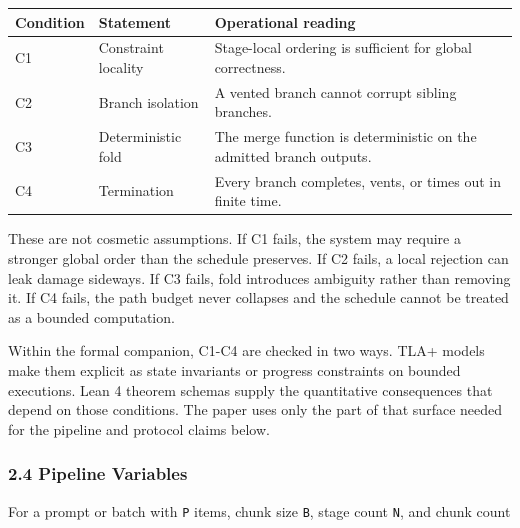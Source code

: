 \documentclass[
  11pt,
]{article}
\newcounter{none} %
\begin{document}
{\def\LTcaptype{none} %
\begin{longtable}[]{@{}
  >{\raggedright\arraybackslash}p{}
  >{\raggedright\arraybackslash}p{}
  >{\raggedright\arraybackslash}p{}@{}}
\toprule\noalign{}
\begin{minipage}[b]{\linewidth}\raggedright
Condition
\end{minipage} & \begin{minipage}[b]{\linewidth}\raggedright
Statement
\end{minipage} & \begin{minipage}[b]{\linewidth}\raggedright
Operational reading
\end{minipage} \\
\midrule\noalign{}
\endhead
\bottomrule\noalign{}
\endlastfoot
C1 & Constraint locality & Stage-local ordering is sufficient for global
correctness. \\
C2 & Branch isolation & A vented branch cannot corrupt sibling
branches. \\
C3 & Deterministic fold & The merge function is deterministic on the
admitted branch outputs. \\
C4 & Termination & Every branch completes, vents, or times out in finite
time. \\
\end{longtable}
}

These are not cosmetic assumptions. If C1 fails, the system may require
a stronger global order than the schedule preserves. If C2 fails, a
local rejection can leak damage sideways. If C3 fails, fold introduces
ambiguity rather than removing it. If C4 fails, the path budget never
collapses and the schedule cannot be treated as a bounded computation.

Within the formal companion, C1-C4 are checked in two ways. TLA+ models
make them explicit as state invariants or progress constraints on
bounded executions. Lean 4 theorem schemas supply the quantitative
consequences that depend on those conditions. The paper uses only the
part of that surface needed for the pipeline and protocol claims below.

\subsubsection{2.4 Pipeline Variables}\label{pipeline-variables}

For a prompt or batch with \texttt{P} items, chunk size \texttt{B},
stage count \texttt{N}, and chunk count
\end{document}
